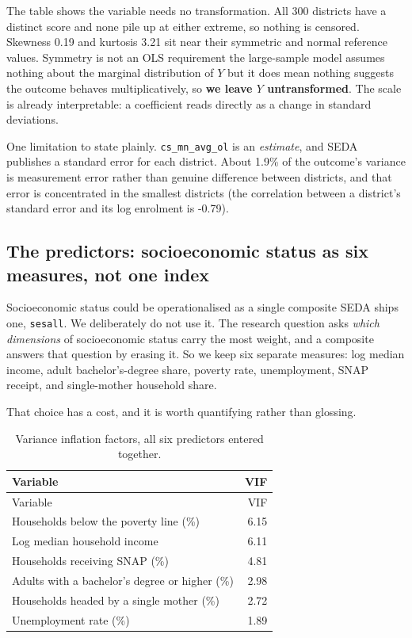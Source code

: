 \documentclass[
]{article}
\newcounter{none} %
\begin{document}
The table shows the variable needs no transformation. All 300 districts
have a distinct score and none pile up at either extreme, so nothing is
censored. Skewness 0.19 and kurtosis 3.21 sit near their symmetric and
normal reference values. Symmetry is not an OLS requirement the
large-sample model assumes nothing about the marginal distribution of
\(Y\) but it does mean nothing suggests the outcome behaves
multiplicatively, so \textbf{we leave \(Y\) untransformed}. The scale is
already interpretable: a coefficient reads directly as a change in
standard deviations.

One limitation to state plainly. \texttt{cs\_mn\_avg\_ol} is an
\emph{estimate}, and SEDA publishes a standard error for each district.
About 1.9\% of the outcome's variance is measurement error rather than
genuine difference between districts, and that error is concentrated in
the smallest districts (the correlation between a district's standard
error and its log enrolment is -0.79).

\subsection{The predictors: socioeconomic status as six measures, not
one
index}\label{the-predictors-socioeconomic-status-as-six-measures-not-one-index}

Socioeconomic status could be operationalised as a single composite SEDA
ships one, \texttt{sesall}. We deliberately do not use it. The research
question asks \emph{which dimensions} of socioeconomic status carry the
most weight, and a composite answers that question by erasing it. So we
keep six separate measures: log median income, adult bachelor's-degree
share, poverty rate, unemployment, SNAP receipt, and single-mother
household share.

That choice has a cost, and it is worth quantifying rather than
glossing.

\begin{longtable}[]{@{}lr@{}}
\caption{Variance inflation factors, all six predictors entered
together.}\tabularnewline
\toprule\noalign{}
Variable & VIF \\
\midrule\noalign{}
\endfirsthead
\toprule\noalign{}
Variable & VIF \\
\midrule\noalign{}
\endhead
\bottomrule\noalign{}
\endlastfoot
Households below the poverty line (\%) & 6.15 \\
Log median household income & 6.11 \\
Households receiving SNAP (\%) & 4.81 \\
Adults with a bachelor's degree or higher (\%) & 2.98 \\
Households headed by a single mother (\%) & 2.72 \\
Unemployment rate (\%) & 1.89 \\
\end{longtable}
\end{document}
